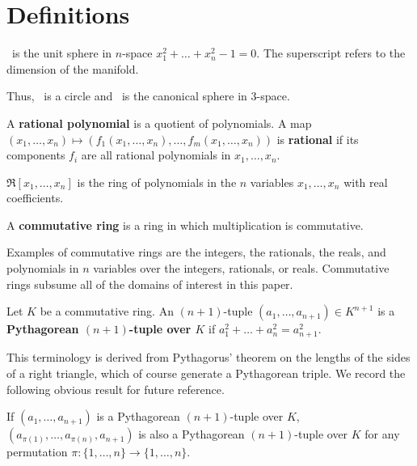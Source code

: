 \section{Definitions}
\label{sec:defn}

\begin{defn2}
\ is the unit sphere in $n$-space $x_1^2 + \ldots + x_{n}^2 - 1 = 0$.
The superscript refers to the dimension of the manifold.
\end{defn2}

\noindent Thus, \ is a circle and \ is the canonical sphere in 3-space.

\begin{defn2}
A {\bf rational polynomial} is a quotient of polynomials.
A map 
$(x_1,\ldots,x_n) \mapsto (f_1 (x_1,\ldots,x_n),\ldots,f_m (x_1,\ldots,x_n))$
is {\bf rational} if 
its components $f_i$ are all rational polynomials in $x_1,\ldots,x_n$.
\end{defn2}

\begin{defn2}
$\Re[x_1,\ldots,x_n]$ is the ring of polynomials in the $n$ variables
$x_1,\ldots,x_n$ with real coefficients.
\end{defn2}

\begin{defn2}
A {\bf commutative ring} is a ring in which multiplication is commutative.
\end{defn2}
%
Examples of commutative rings are the integers, the rationals, the reals,
and polynomials in $n$ variables over the integers, rationals, or reals.
Commutative rings subsume all of the domains of interest in this paper.

\begin{defn2}
Let $K$ be a commutative ring.
An $(n+1)$-tuple $(a_1,\ldots,a_{n+1}) \in K^{n+1}$
is a {\bf Pythagorean $(n+1)$-tuple over $K$} 
if $a_1^2 + \ldots + a_n^2 = a_{n+1}^2$.
\end{defn2}
%
This terminology is derived from Pythagorus' theorem on the lengths
of the sides of a right triangle, which of course generate
a Pythagorean triple.
We record the following obvious result for future reference.

\begin{lemma}
\label{lem:perm}
If $(a_1,\ldots,a_{n+1})$ is a Pythagorean $(n+1)$-tuple over $K$,
$(a_{\pi(1)},\ldots,a_{\pi(n)},a_{n+1})$ is also a Pythagorean 
$(n+1)$-tuple over $K$ for any permutation 
$\pi : \{1,\ldots,n\} \rightarrow \{1,\ldots,n\}$.
\end{lemma}


